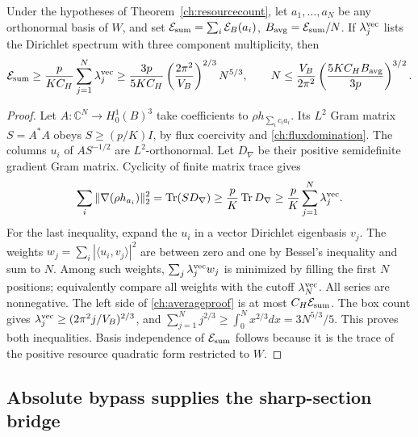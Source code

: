 \begin{theorem}
\label{ch:average}
Under the hypotheses of Theorem~\ref{ch:resourcecount}, let
$a_1,\ldots,a_N$ be any orthonormal basis of $W$, and set
$\mathcal E_{\rm sum}=\sum_i\mathcal E_B(a_i)$,
$B_{\rm avg}=\mathcal E_{\rm sum}/N$.  If $\lambda_j^{\rm vec}$ lists
the Dirichlet spectrum with three component multiplicity, then
\begin{equation}
 \mathcal E_{\rm sum}\geq\frac{p}{K C_H}
 \sum_{j=1}^N\lambda_j^{\rm vec}
 \geq\frac{3p}{5K C_H}
 \left(\frac{2\pi^2}{V_B}\right)^{2/3}N^{5/3},\qquad
 N\leq\frac{V_B}{2\pi^2}
 \left(\frac{5K C_HB_{\rm avg}}{3p}\right)^{3/2}.
 \label{ch:averagebound}
\end{equation}
\end{theorem}
\begin{proof}
Let $A:\mathbb C^N\to H^1_0(B)^3$ take coefficients to
$\rho h_{\sum_i c_i a_i}$.  Its $L^2$ Gram matrix $S=A^*A$ obeys
$S\geq(p/K)I$, by flux coercivity and \eqref{ch:fluxdomination}.
The columns $u_i$ of $AS^{-1/2}$ are $L^2$-orthonormal.  Let $D_\nabla$
be their positive semidefinite gradient Gram matrix.  Cyclicity of finite
matrix trace gives
\begin{equation}
 \sum_i\|\nabla(\rho h_{a_i})\|_2^2
 =\operatorname{Tr}(S D_\nabla)
 \geq\frac pK\operatorname{Tr}D_\nabla
 \geq\frac pK\sum_{j=1}^N\lambda_j^{\rm vec}.
 \label{ch:averageproof}
\end{equation}
For the last inequality, expand the $u_i$ in a vector Dirichlet eigenbasis
$v_j$.  The weights $w_j=\sum_i|\langle u_i,v_j\rangle|^2$ are between
zero and one by Bessel's inequality and sum to $N$.  Among such weights,
$\sum_j\lambda_j^{\rm vec}w_j$ is minimized by filling the first $N$
positions; equivalently compare all weights with the cutoff
$\lambda_N^{\rm vec}$.  All series are nonnegative.
The left side of \eqref{ch:averageproof} is at most
$C_H\mathcal E_{\rm sum}$.  The box count gives
$\lambda_j^{\rm vec}\geq(2\pi^2j/V_B)^{2/3}$, and
$\sum_{j=1}^Nj^{2/3}\geq\int_0^Nx^{2/3}dx=3N^{5/3}/5$.
This proves both inequalities.  Basis independence of
$\mathcal E_{\rm sum}$ follows because it is the trace of the positive
resource quadratic form restricted to $W$.
\end{proof}

\subsection{Absolute bypass supplies the sharp-section bridge}
\label{ch:bypassbridge}

